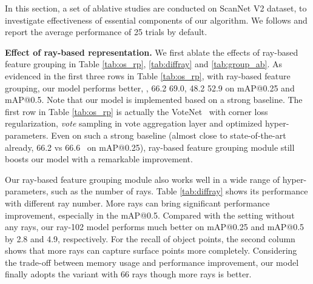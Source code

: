 \documentclass[final]{cvpr}
\begin{document}
In this section, a set of ablative studies are conducted on 
ScanNet V2 dataset, to investigate effectiveness of essential components of our algorithm. We follows \cite{liu2021group} and report the average performance of 25 trials by default.

\noindent \textbf{Effect of ray-based representation.} We first ablate the effects of ray-based feature grouping in Table \ref{tab:os_rp}, \ref{tab:diffray} and \ref{tab:group_ab}. As evidenced in the first three rows in Table \ref{tab:os_rp}, with ray-based feature grouping, our model performs better, \ie, 66.2  69.0, 48.2  52.9 on mAP@0.25 and mAP@0.5. Note that our model is implemented based on a strong baseline. The first row in Table \ref{tab:os_rp} is actually the VoteNet~\cite{qi2019deep} with corner loss regularization, \textit{vote} sampling in vote aggregation layer and optimized hyper-parameters. Even on such a strong baseline (almost close to state-of-the-art already, 66.2 vs 66.6~\cite{liu2021group} on mAP@0.25), ray-based feature grouping module still boosts our model with a remarkable improvement. 

Our ray-based feature grouping module also works well in a wide range of hyper-parameters, such as the number of rays. Table \ref{tab:diffray} shows its performance with different ray number. More rays can bring significant performance improvement, especially in the mAP@0.5. Compared with the setting without any rays, our ray-102 model performs much better on mAP@0.25 and mAP@0.5 by 2.8 and 4.9, respectively. 
For the recall of object points, 
the second column shows that more rays can capture surface points more completely. 
Considering the trade-off between memory usage and performance improvement, our model finally adopts the variant with 66 rays though more rays is better.
\end{document}
